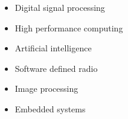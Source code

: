 \begin{itemize}
	\item Digital signal processing
	\item High performance computing
	\item Artificial intelligence
	\item Software defined radio
	\item Image processing
	\item Embedded systems
\end{itemize}

